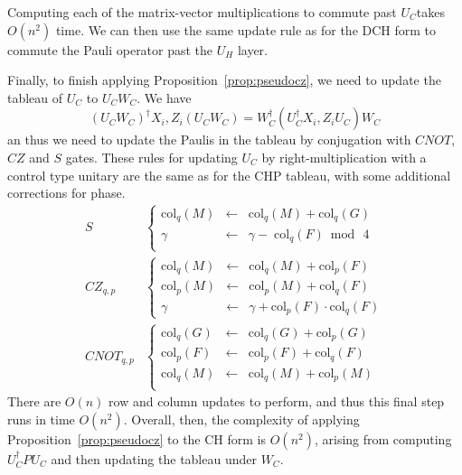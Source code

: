 Computing each of the matrix-vector multiplications to commute past $U_{C} $takes $O(n^{2})$ time. We can then use the same update rule as for the DCH form to commute the Pauli operator past the $U_{H}$ layer.\par
Finally, to finish applying Proposition~\ref{prop:pseudocz}, we need to update the tableau of $U_{C}$ to $U_{C}W_{C}$. We have
\[\left(U_{C}W_{C}\right)^{\dagger}X_{i},Z_{i}\left(U_{C}W_{C}\right) = W_{C}^{\dagger}\left(U_{C}^{\dagger}X_{i},Z_{i}U_{C}\right)W_{C}\]
an thus we need to update the Paulis in the tableau by conjugation with $CNOT$, $CZ$ and $S$ gates. These rules for updating $U_{C}$ by right-multiplication with a control type unitary are the same as for the CHP tableau, with some additional corrections for phase.
\begin{align}
S & \left\{
\begin{array}{rcl}
\text{col}_{q}(M)  & \gets & \text{col}_{q}(M)+\text{col}_{q}(G) \\
\gamma & \gets & \gamma - \; \text{col}_{q}(F) \bmod\,4 \\
\end{array}\right. \nonumber \\
CZ_{q,p} & \left\{
\begin{array}{rcl}
\text{col}_{q}(M) & \gets & \text{col}_{q}(M) + \text{col}_{p}(F) \\
\text{col}_{p}(M) & \gets & \text{col}_{p}(M) + \text{col}_{q}(F) \\
\gamma & \gets & \gamma + \text{col}_{p}(F) \cdot \text{col}_{q}(F)
\end{array} \right. \nonumber \\ 
CNOT_{q,p} & \left\{
\begin{array}{rcl}
\text{col}_{q}(G) & \gets & \text{col}_{q}(G) + \text{col}_{p}(G)\\
\text{col}_{p}(F) & \gets & \text{col}_{p}(F) + \text{col}_{q}(F)\\
\text{col}_{q}(M) & \gets & \text{col}_{q}(M) + \text{col}_{p}(M)\\
\end{array}\right.
\end{align}
There are $O(n)$ row and column updates to perform, and thus this final step runs in time $O(n^{2})$. Overall, then, the complexity of applying Proposition~\ref{prop:pseudocz} to the CH form is $O(n^{2})$, arising from computing $U_{C}^{\dagger}PU_{C}$ and then updating the tableau under $W_{C}$.
